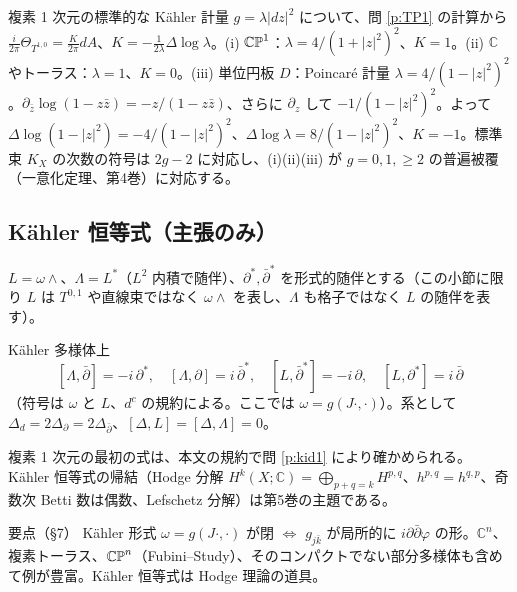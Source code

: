 \begin{ex}[3 つの幾何：$K=1,0,-1$]\label{ex:trichotomy}\tP
複素 1 次元の標準的な Kähler 計量 $g=\lambda|dz|^2$ について、問 \ref{p:TP1} の計算から $\frac i{2\pi}\Theta_{T^{1,0}}=\frac K{2\pi}dA$、$K=-\frac1{2\lambda}\Delta\log\lambda$。(i) $\mathbb{CP}^1$：$\lambda=4/(1+|z|^2)^2$、$K=1$。(ii) $\mathbb C$ やトーラス：$\lambda=1$、$K=0$。(iii) 単位円板 $D$：Poincaré 計量 $\lambda=4/(1-|z|^2)^2$。$\partial_{\bar z}\log(1-z\bar z)=-z/(1-z\bar z)$、さらに $\partial_z$ して $-1/(1-|z|^2)^2$。よって $\Delta\log(1-|z|^2)=-4/(1-|z|^2)^2$、$\Delta\log\lambda=8/(1-|z|^2)^2$、$K=-1$。標準束 $K_X$ の次数の符号は $2g-2$ に対応し、(i)(ii)(iii) が $g=0,1,\ge2$ の普遍被覆（一意化定理、第4巻）に対応する。
\end{ex}

\subsection{Kähler 恒等式（主張のみ）}
$L=\omega\wedge$、$\Lambda=L^*$（$L^2$ 内積で随伴）、$\partial^*,\bar\partial^*$ を形式的随伴とする（この小節に限り $L$ は $T^{0,1}$ や直線束ではなく $\omega\wedge$ を表し、$\Lambda$ も格子ではなく $L$ の随伴を表す）。
\begin{thm}\tC\label{thm:kid}
Kähler 多様体上
\[
[\Lambda,\bar\partial]=-i\,\partial^*,\quad[\Lambda,\partial]=i\,\bar\partial^*,\quad[L,\bar\partial^*]=-i\,\partial,\quad[L,\partial^*]=i\,\bar\partial
\]
（符号は $\omega$ と $L$、$d^c$ の規約による。ここでは $\omega=g(J\cdot,\cdot)$）。系として $\Delta_d=2\Delta_\partial=2\Delta_{\bar\partial}$、$[\Delta,L]=[\Delta,\Lambda]=0$。
\end{thm}
複素 1 次元の最初の式は、本文の規約で問 \ref{p:kid1} により確かめられる。Kähler 恒等式の帰結（Hodge 分解 $H^k(X;\mathbb C)=\bigoplus_{p+q=k}H^{p,q}$、$h^{p,q}=h^{q,p}$、奇数次 Betti 数は偶数、Lefschetz 分解）は第5巻の主題である。

\begin{keybox}{要点（§7）}
Kähler 形式 $\omega=g(J\cdot,\cdot)$ が閉 $\iff$ $g_{j\bar k}$ が局所的に $i\partial\bar\partial\varphi$ の形。$\mathbb C^n$、複素トーラス、$\mathbb{CP}^n$（Fubini--Study）、そのコンパクトでない部分多様体も含めて例が豊富。Kähler 恒等式は Hodge 理論の道具。
\end{keybox}


